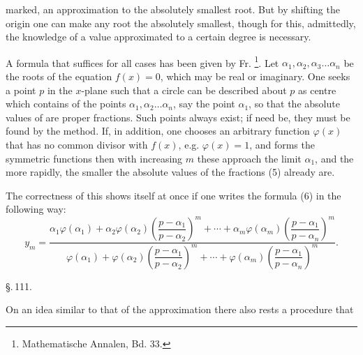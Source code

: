 marked, an approximation to the absolutely smallest root. But by shifting the origin one can make any root the absolutely smallest, though for this, admittedly, the knowledge of a value approximated to a certain degree is necessary.

A formula that suffices for all cases has been given by Fr. \footnote{Mathematische Annalen, Bd. 33.}. Let $\alpha_1, \alpha_2, \alpha_3 \ldots \alpha_n$ be the roots of the equation $f(x) = 0$, which may be real or imaginary. One seeks a point $p$ in the $x$-plane such that a circle can be described about $p$ as centre which contains  of the points $\alpha_1, \alpha_2 \ldots \alpha_n$, say the point $\alpha_1$, so that the absolute values of
are proper fractions. Such points always exist; if need be, they must be found by the  method. If, in addition, one chooses an arbitrary function $\varphi(x)$ that has no common divisor with $f(x)$, e.g. $\varphi(x) = 1$, and forms the symmetric functions
then with increasing $m$ these approach the limit $\alpha_1$, and the more rapidly, the smaller the absolute values of the fractions (5) already are.

The correctness of this shows itself at once if one writes the formula (6) in the following way:
\[
y_m = \frac{\alpha_1\varphi(\alpha_1) + \alpha_2\varphi(\alpha_2)\left(\dfrac{p-\alpha_1}{p-\alpha_2}\right)^m + \cdots + \alpha_m\varphi(\alpha_m)\left(\dfrac{p-\alpha_1}{p-\alpha_n}\right)^m}{\varphi(\alpha_1) + \varphi(\alpha_2)\left(\dfrac{p-\alpha_1}{p-\alpha_2}\right)^m + \cdots + \varphi(\alpha_m)\left(\dfrac{p-\alpha_1}{p-\alpha_n}\right)^m}.
\]

\begin{center}
\S.\,111.

\end{center}

On an idea similar to that of the  approximation there also rests a procedure that 
